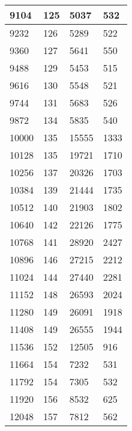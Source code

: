 \begin{longtable}{|l|l|l|l|}
		9104  & 125         & 5037            & 532              \\ \hline
		9232  & 126         & 5289            & 522              \\ \hline
		9360  & 127         & 5641            & 550              \\ \hline
		9488  & 129         & 5453            & 515              \\ \hline
		9616  & 130         & 5548            & 521              \\ \hline
		9744  & 131         & 5683            & 526              \\ \hline
		9872  & 134         & 5835            & 540              \\ \hline
		10000 & 135         & 15555           & 1333             \\ \hline
		10128 & 135         & 19721           & 1710             \\ \hline
		10256 & 137         & 20326           & 1703             \\ \hline
		10384 & 139         & 21444           & 1735             \\ \hline
		10512 & 140         & 21903           & 1802             \\ \hline
		10640 & 142         & 22126           & 1775             \\ \hline
		10768 & 141         & 28920           & 2427             \\ \hline
		10896 & 146         & 27215           & 2212             \\ \hline
		11024 & 144         & 27440           & 2281             \\ \hline
		11152 & 148         & 26593           & 2024             \\ \hline
		11280 & 149         & 26091           & 1918             \\ \hline
		11408 & 149         & 26555           & 1944             \\ \hline
		11536 & 152         & 12505           & 916              \\ \hline
		11664 & 154         & 7232            & 531              \\ \hline
		11792 & 154         & 7305            & 532              \\ \hline
		11920 & 156         & 8532            & 625              \\ \hline
		12048 & 157         & 7812            & 562              \\ \hline

\end{longtable}
